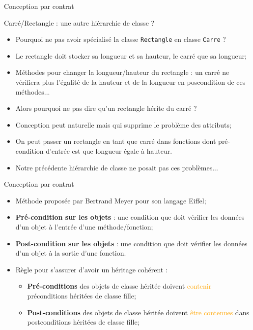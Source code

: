 \documentclass[compress,10pt,aspectratio=169]{beamer}
\begin{document}
\begin{frame}[fragile]{Conception par contrat}
  \scriptsize\vspace*{-4mm}
  \begin{block}{\small Carré/Rectangle : une autre hiérarchie de classe ?}
  \vspace*{-1mm}
  \begin{itemize}
  \item Pourquoi ne pas avoir spécialisé la classe \texttt{Rectangle} en classe \texttt{Carre} ?
  \item Le rectangle doit stocker sa longueur et sa hauteur, le carré que sa longueur;
  \item Méthodes pour changer la longueur/hauteur du rectangle : un carré ne vérifiera plus l'égalité de la hauteur et de la longueur en poscondition de ces méthodes...
  \item Alors pourquoi ne pas dire qu'un rectangle hérite du carré ?
  \item Conception peut naturelle mais qui supprime le problème des attributs;
  \item On peut passer un rectangle en tant que carré dans fonctions dont
        pré-condition d'entrée est que longueur égale à hauteur.
  \item Notre précédente hiérarchie de classe ne posait pas ces problèmes...
  \end{itemize}
  \end{block}
\vspace*{-4mm}  
  \begin{block}{\small Conception par contrat}
  \vspace*{-1mm}
  \begin{itemize}
  \item Méthode proposée par Bertrand Meyer pour son langage Eiffel;
  \item \textbf{Pré-condition sur les objets} : une condition que doit vérifier les données d'un objet à l'entrée d'une méthode/fonction;
  \item \textbf{Post-condition sur les objets} : une condition que doit vérifier les données d'un objet à la sortie d'une fonction.
  \vspace*{-1mm}
  \item {\color{blue}Règle pour s'assurer d'avoir un héritage cohérent} : 
  \begin{itemize}
  \scriptsize
  \item \textbf{Pré-conditions} des objets de classe héritée doivent \textcolor{orange}{contenir} préconditions héritées de classe fille;
  \item \textbf{Post-conditions} des objets de classe héritée doivent \textcolor{orange}{être contenues} dans postconditions héritées de classe fille;
  \end{itemize}
  \end{itemize}
  \end{block}
  \end{frame}
  
\end{document}

